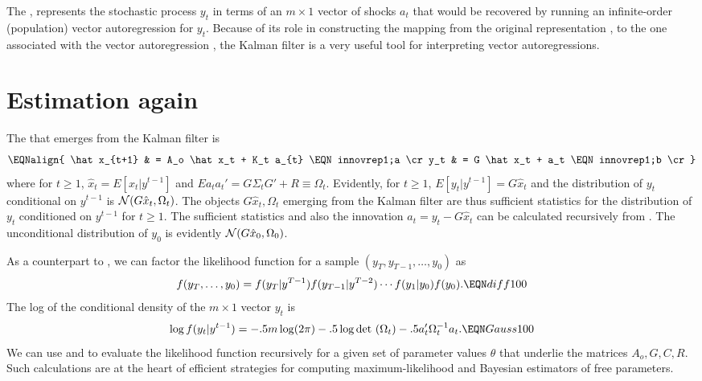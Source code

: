 The  ,  represents  the %
stochastic process $y_t$
in terms of an $ m \times 1$ vector of shocks $a_t$ that would  be recovered by running an infinite-order (population) vector autoregression
for $y_t$.  Because of its role in constructing the mapping from the original representation , to the one associated
with the vector autoregression , the    Kalman filter is a very useful tool for interpreting vector autoregressions.
%



\section{Estimation again}\label{sec:estimation2}%
The  that emerges from the Kalman filter
is
$$ \EQNalign{ \hat x_{t+1} & = A_o \hat x_t + K_t a_{t} \EQN innovrep1;a \cr
            y_t & = G \hat x_t + a_t \EQN innovrep1;b \cr} $$
where for $t\geq 1$, $\hat x_t = E[x_t | y^{t-1}]$ and $E a_t a_t' = G \Sigma_t G' + R \equiv \Omega_t$.
Evidently, for $t \geq 1$,  $ E [y_t | y^{t-1}] = G \hat x_{t}$ and
the  distribution of $y_t$ conditional on $y^{t-1}$ is ${\cal N}(G \hat x_{t}, \Omega_t)$.  The objects
$G \hat x_{t}, \Omega_t$ emerging from the Kalman filter are thus sufficient statistics for the
distribution of $y_t$ conditioned on $y^{t-1}$ for $ t \geq 1$.  The sufficient statistics and also the innovation
$a_t = y_t - G \hat x_t$ can be calculated recursively from .  The unconditional distribution of
$y_0$ is evidently ${\cal N}(G \hat x_0, \Omega_0)$.

As a counterpart to , we can factor the likelihood function for a sample $(y_T, y_{T-1}, \ldots, y_0)$ as
$$ f(y_T, \ldots, y_0) = f(y_T \vert y^{T-1})
     f(y_{T-1} \vert y^{T-2}) \cdots
       f(y_1 \vert y_0) f(y_0). \EQN diff100 $$
 The log  of the conditional density
of the $m\times 1$ vector  $y_{t}$ is
 $$  \log f(y_{t} \vert y^{t-1})  =  -.5 m \log (2 \pi)
  -.5 \log {\rm det} \ (\Omega_t)   - .5
a_t' \Omega_t^{-1} a_t .  \EQN Gauss100 $$
We can use  and  to evaluate  the likelihood function  
recursively for a given set of parameter values   $\theta$ that underlie the matrices $A_o, G, C, R$.  Such calculations are at the heart of efficient strategies for computing   maximum-likelihood
and Bayesian estimators of free parameters.

